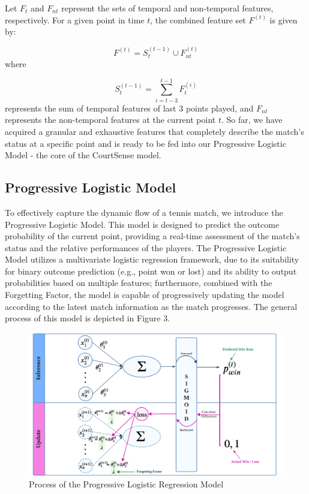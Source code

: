 \documentclass[12pt]{article}  %
\begin{document}
Let \( F_{t} \) and \( F_{nt} \) represent the sets of temporal and non-temporal features, respectively. For a given point in time \( t \), the combined feature set \( F^{(t)} \) is given by:

\[
F^{(t)} = S_{t}^{(t-1)} \cup F_{nt}^{(t)}
\]
where

\[
S_{t}^{(t-1)} = \sum_{i=t-3}^{t-1} F_{t}^{(i)}
\]
represents the sum of temporal features of last 3 points played, and \( F_{nt} \) represents the non-temporal features at the current point \( t \). So far, we have acquired a granular and exhaustive features that completely describe the match's status at a specific point and is ready to be fed into our Progressive Logistic Model - the core of the CourtSense model.

\subsection{Progressive Logistic Model}
To effectively capture the dynamic flow of a tennis match, we introduce the Progressive Logistic Model. This model is designed to predict the outcome probability of the current point, providing a real-time assessment of the match's status and the relative performances of the players. The Progressive Logistic Model utilizes a multivariate logistic regression framework, due to its suitability for binary outcome prediction (e.g., point won or lost) and its ability to output probabilities based on multiple features; furthermore, combined with the Forgetting Factor, the model is capable of progressively updating the model according to the latest match information as the match progresses. The general process of this model is depicted in Figure 3. 

\begin{figure}[htbp]  %
	\centering  %
	\includegraphics[width=.9\textwidth]{logistic.png} %
	\caption{Process of the Progressive Logistic Regression Model} %
\end{figure}
\vspace{-0.8cm}
\end{document}
